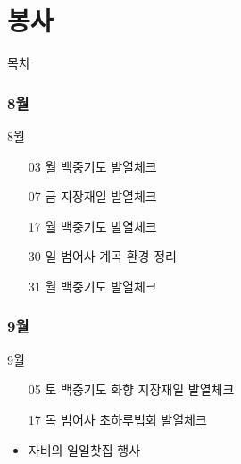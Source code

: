\documentclass[aspectratio=1610,17pt,xcolor=pdftex,dvipsnames,table,handout]{beamer}
\begin{document}
		\part{봉사 }
		\frame{\partpage}


		\begin{frame} [plain]{목차}
		\tableofcontents
		\end{frame}
		


		\section{8월  }
		

		\begin{frame} [t,plain]
			\begin{block} {8월 }
			\begin{itemize}
					\item [03] 월 백중기도 발열체크
					\item [07] 금 지장재일 발열체크
					\item [17] 월 백중기도 발열체크
					\item [30] 일 범어사 계곡 환경 정리
					\item [31] 월 백중기도 발열체크

			\end{itemize}
			\end{block}
		\end{frame}


		\section{9월  }
		

		\begin{frame} [t,plain]
			\begin{block} {9월 }
			\begin{itemize}
					\item [05] 토 	백중기도 화향 지장재일 발열체크
					\item [17] 목 	범어사 초하루법회 발열체크
					\item 자비의 일일찻집 행사 
			\end{itemize}
			\end{block}
		\end{frame}
\end{document}
